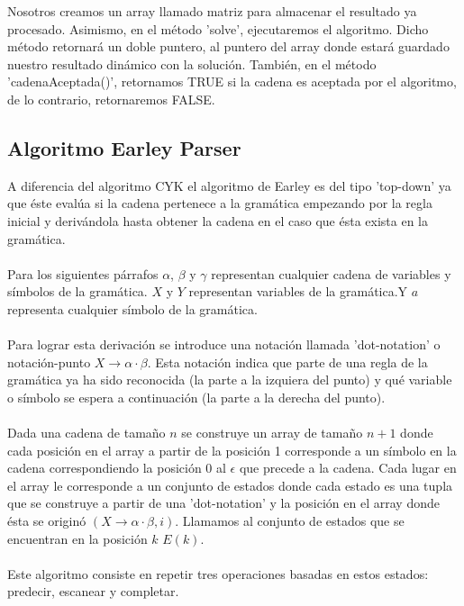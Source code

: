 \documentclass[12pt]{article}
\begin{document}
Nosotros creamos un array llamado matriz para almacenar el resultado ya procesado. Asimismo, en el método 'solve', ejecutaremos el algoritmo. Dicho método retornará un doble puntero, al puntero del array donde estará guardado nuestro resultado dinámico con la solución. También, en el método 'cadenaAceptada()', retornamos TRUE si la cadena es aceptada por el algoritmo, de lo contrario, retornaremos FALSE.


%

\newpage


\subsection{Algoritmo Earley Parser}
A diferencia del algoritmo CYK el algoritmo de Earley es del tipo 'top-down' ya que éste evalúa si la cadena pertenece a la gramática empezando por la regla inicial y derivándola hasta obtener la cadena en el caso que ésta exista en la gramática.
\\\\
Para los siguientes párrafos $\alpha$, $\beta$ y $\gamma$ representan cualquier cadena de variables y símbolos de la gramática. $X$ y $Y$ representan variables de la gramática.Y $a$ representa cualquier símbolo de la gramática.
\\\\
Para lograr esta derivación se introduce una notación llamada 'dot-notation' o notación-punto $X \rightarrow \alpha \cdot \beta$. Esta notación indica que parte de una regla de la gramática ya ha sido reconocida (la parte a la izquiera del punto) y qué variable o símbolo se espera a continuación (la parte a la derecha del punto).
\\\\
Dada una cadena de tamaño $n$ se construye un array de tamaño $n+1$ donde cada posición en el array a partir de la posición 1 corresponde a un símbolo en la cadena correspondiendo la posición 0 al $\epsilon$ que precede a la cadena. Cada lugar en el array le corresponde a un conjunto de estados donde cada estado es una tupla que se construye a partir de una 'dot-notation' y la posición en el array donde 
ésta se originó $(X \rightarrow \alpha \cdot \beta, i)$. Llamamos al conjunto de estados que se encuentran en la posición $k$ $E(k)$.
\\\\

Este algoritmo consiste en repetir tres operaciones basadas en estos estados: predecir, escanear y  completar.
\end{document}
